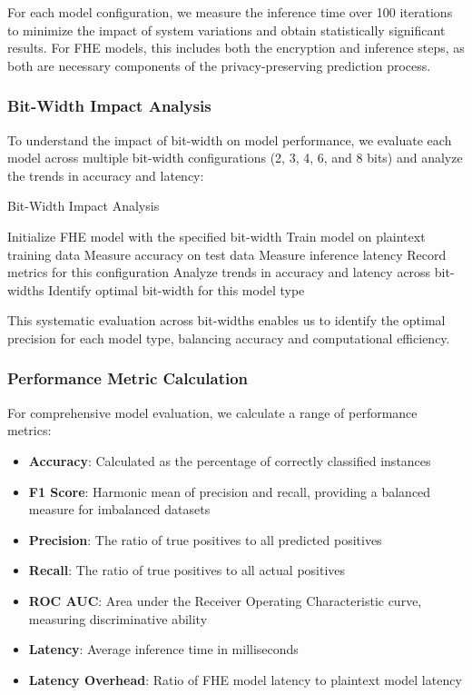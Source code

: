 \documentclass[a4paper,12pt]{article}
\begin{document}
For each model configuration, we measure the inference time over 100 iterations to minimize the impact of system variations and obtain statistically significant results. For FHE models, this includes both the encryption and inference steps, as both are necessary components of the privacy-preserving prediction process.

\subsubsection{Bit-Width Impact Analysis}
To understand the impact of bit-width on model performance, we evaluate each model across multiple bit-width configurations (2, 3, 4, 6, and 8 bits) and analyze the trends in accuracy and latency:

\begin{algorithm}
\caption{Bit-Width Impact Analysis}
\begin{algorithmic}[1]
        \STATE Initialize FHE model with the specified bit-width
        \STATE Train model on plaintext training data
        \STATE Measure accuracy on test data
        \STATE Measure inference latency
        \STATE Record metrics for this configuration
    \ENDFOR
    \STATE Analyze trends in accuracy and latency across bit-widths
    \STATE Identify optimal bit-width for this model type
\ENDFOR
\end{algorithmic}
\end{algorithm}

This systematic evaluation across bit-widths enables us to identify the optimal precision for each model type, balancing accuracy and computational efficiency.

\subsubsection{Performance Metric Calculation}
For comprehensive model evaluation, we calculate a range of performance metrics:

\begin{itemize}
    \item \textbf{Accuracy}: Calculated as the percentage of correctly classified instances
    \item \textbf{F1 Score}: Harmonic mean of precision and recall, providing a balanced measure for imbalanced datasets
    \item \textbf{Precision}: The ratio of true positives to all predicted positives
    \item \textbf{Recall}: The ratio of true positives to all actual positives
    \item \textbf{ROC AUC}: Area under the Receiver Operating Characteristic curve, measuring discriminative ability
    \item \textbf{Latency}: Average inference time in milliseconds
    \item \textbf{Latency Overhead}: Ratio of FHE model latency to plaintext model latency
\end{itemize}
\end{document}
